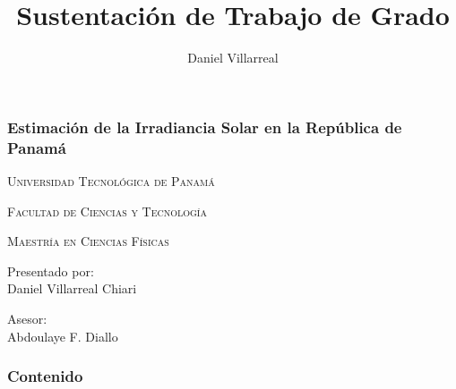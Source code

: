 \documentclass{beamer}
\author{Daniel Villarreal}
\title{Sustentación de Trabajo de Grado}
\begin{document}
\begin{frame}
     \frametitle{Estimación de la Irradiancia Solar en la República de Panamá}
      \begin{figure}[h!]
         \centering {}
         \hspace{5cm}
         \centering {}
      \end{figure}
      \begin{center}
         {\scshape \small Universidad Tecnológica de Panamá \par}
         {\scshape Facultad de Ciencias y Tecnología \par}
         {\scshape Maestría en Ciencias Físicas \par}
         \vspace{0.3cm}
         Presentado por: \\
         Daniel Villarreal Chiari \\
         \begin{large}
            Asesor: \\
            Abdoulaye F. Diallo \\
         \end{large}
      \end{center}
\end{frame}

\begin{frame}
    \frametitle{Contenido}
    \tableofcontents
\end{frame}

\end{document}

